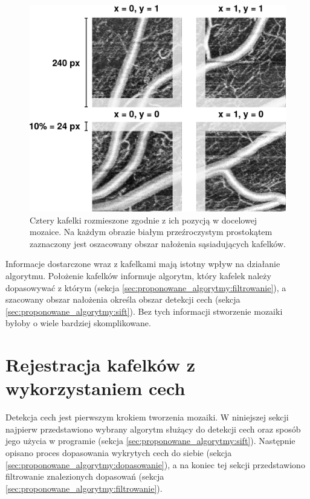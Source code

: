 \begin{figure}[htb]
  \centering
  \includegraphics[width=\textwidth]{gfx/example}
  \caption{Cztery kafelki rozmieszone zgodnie z ich pozycją w docelowej mozaice. Na każdym obrazie białym przeźroczystym prostokątem zaznaczony jest oszacowany obszar nałożenia sąsiadujących kafelków.}
  \label{fig:proponowane_algorytmy:example}
\end{figure}

Informacje dostarczone wraz z kafelkami mają istotny wpływ na działanie algorytmu. Położenie kafelków informuje algorytm, który kafelek należy dopasowywać z którym (sekcja \ref{sec:proponowane_algorytmy:filtrowanie}), a szacowany obszar nałożenia określa obszar detekcji cech (sekcja \ref{sec:proponowane_algorytmy:sift}). Bez tych informacji stworzenie mozaiki byłoby o wiele bardziej skomplikowane.

\section{Rejestracja kafelków z wykorzystaniem cech}
\label{sec:proponowane_algorytmy:cechy}

Detekcja cech jest pierwszym krokiem tworzenia mozaiki. W niniejszej sekcji najpierw przedstawiono wybrany algorytm służący do detekcji cech oraz sposób jego użycia w programie (sekcja \ref{sec:proponowane_algorytmy:sift}). Następnie opisano proces dopasowania wykrytych cech do siebie (sekcja \ref{sec:proponowane_algorytmy:dopasowanie}), a na koniec tej sekcji przedstawiono filtrowanie znalezionych dopasowań (sekcja \ref{sec:proponowane_algorytmy:filtrowanie}).

